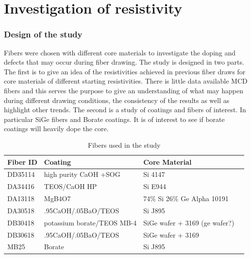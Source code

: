 \chapter{Investigation of resistivity}
\subsection{Design of the study}
Fibers were chosen with different core materials to investigate the doping and defects that may occur during fiber drawing. The study is designed in two parts. The first is to give an idea of the resistivities achieved in previous fiber draws for core materials of different starting resistivities. There is little data available MCD fibers and this serves the purpose to give an understanding of what may happen during different drawing conditions, the consistency of the results as well as highlight other trends. The second is a study of coatings and fibers of interest. In particular SiGe fibers and Borate coatings. It is of interest to see if borate coatings will heavily dope the core.

 \begin{table}[h]
\begin{center}
    \begin{tabular}{|l|l|l|l|  }
    \hline
    \textbf{Fiber ID} & \textbf{Coating} & \textbf{Core Material}   \\ \hline
    
      DD35114 & high purity CaOH +SOG & Si 4147 \\
      DA34416 & TEOS/CaOH HP & Si E944 \\
      DA13118 & MgB4O7 & 74\% Si 26\% \newline Ge Alpha 10191 \\
      DA30518 & .95CaOH/.05BaO/TEOS & Si J895  \\ 
      DB30418 & potassium borate/TEOS MB-4 & SiGe wafer \newline+ 3169 (ge wafer?)    \\ 
      DB30618 & .95CaOH/.05BaO/TEOS & SiGe wafer \newline + 3169   \\ 
      MB25 & Borate & Si J895  \\
      
     \hline
    \end{tabular}
\end{center}
\caption{Fibers used in the study}
\label{Tab1}
\end{table}

